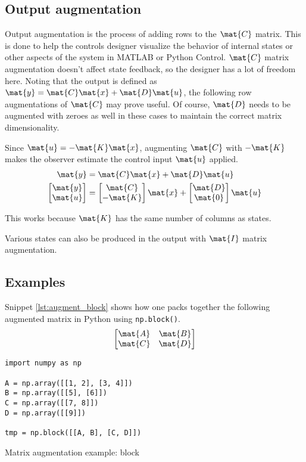 \subsection{Output augmentation}

Output augmentation is the process of adding rows to the $\mat{C}$ matrix. This
is done to help the controls designer visualize the behavior of internal states
or other aspects of the \gls{system} in MATLAB or Python Control. $\mat{C}$
matrix augmentation doesn't affect \gls{state} feedback, so the designer has a
lot of freedom here. Noting that the \gls{output} is defined as
$\mat{y} = \mat{C}\mat{x} + \mat{D}\mat{u}$, the following row augmentations of
$\mat{C}$ may prove useful. Of course, $\mat{D}$ needs to be augmented with
zeroes as well in these cases to maintain the correct matrix dimensionality.

Since $\mat{u} = -\mat{K}\mat{x}$, augmenting $\mat{C}$ with $-\mat{K}$ makes
the \gls{observer} estimate the \gls{control input} $\mat{u}$ applied.
\begin{align*}
  \mat{y} &= \mat{C}\mat{x} + \mat{D}\mat{u} \\
  \begin{bmatrix}
    \mat{y} \\
    \mat{u}
  \end{bmatrix} &=
  \begin{bmatrix}
    \mat{C} \\
    -\mat{K}
  \end{bmatrix}
  \mat{x} +
  \begin{bmatrix}
    \mat{D} \\
    \mat{0}
  \end{bmatrix}
  \mat{u}
\end{align*}

This works because $\mat{K}$ has the same number of columns as \glspl{state}.

Various \glspl{state} can also be produced in the \gls{output} with $\mat{I}$
matrix augmentation.

\subsection{Examples}

Snippet \ref{lst:augment_block} shows how one packs together the following
augmented matrix in Python using \texttt{np.block()}.
\begin{equation*}
  \begin{bmatrix}
    \mat{A} & \mat{B} \\
    \mat{C} & \mat{D}
  \end{bmatrix}
\end{equation*}
\begin{code}
  \begin{lstlisting}[style=customPython]
import numpy as np

A = np.array([[1, 2], [3, 4]])
B = np.array([[5], [6]])
C = np.array([[7, 8]])
D = np.array([[9]])

tmp = np.block([[A, B], [C, D]])
  \end{lstlisting}
  \caption{Matrix augmentation example: block}
  \label{lst:augment_block}
\end{code}

